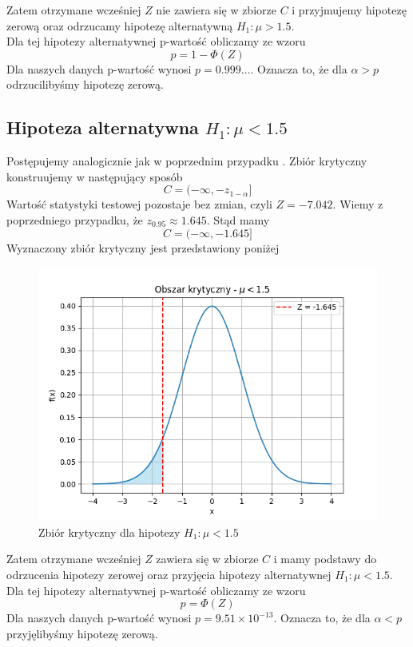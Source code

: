 \documentclass{article}
\begin{document}
Zatem otrzymane wcześniej $Z$ nie zawiera się w zbiorze $C$ i przyjmujemy hipotezę zerową oraz odrzucamy hipotezę alternatywną $H_{1}:\mu>1.5$.\\
Dla tej hipotezy alternatywnej p-wartość obliczamy ze wzoru
\begin{equation}
    p = 1-\Phi(Z)
\end{equation}
Dla naszych danych p-wartość wynosi $p=0.999\dots$. Oznacza to, że dla $\alpha>p$ odrzucilibyśmy hipotezę zerową.

\subsection{Hipoteza alternatywna $H_{1}: \mu<1.5$}
Postępujemy analogicznie jak w poprzednim przypadku . Zbiór krytyczny konstruujemy w następujący sposób
\begin{equation}
C = (-\infty, -z_{1-\alpha}]
\end{equation}
Wartość statystyki testowej pozostaje bez zmian, czyli $Z=-7.042$. Wiemy z poprzedniego przypadku, że $z_{0.95}\approx1.645$. Stąd mamy
\begin{equation}
C = (-\infty,-1.645]
\end{equation}
Wyznaczony zbiór krytyczny jest przedstawiony poniżej
\begin{figure}[H]
    \centering
    \includegraphics[scale=0.5]{mu_l.png}
    \caption{Zbiór krytyczny dla hipotezy $H_{1}:\mu<1.5$}
    \label{fig:3}
\end{figure}
Zatem otrzymane wcześniej $Z$ zawiera się w zbiorze $C$ i mamy podstawy do odrzucenia hipotezy zerowej oraz przyjęcia hipotezy alternatywnej $H_{1}:\mu<1.5$.\\
Dla tej hipotezy alternatywnej p-wartość obliczamy ze wzoru
\begin{equation}
    p = \Phi(Z)
\end{equation}
Dla naszych danych p-wartość wynosi $p=9.51\times10^{-13}$. Oznacza to, że dla $\alpha<p$ przyjęlibyśmy hipotezę zerową.
\end{document}
